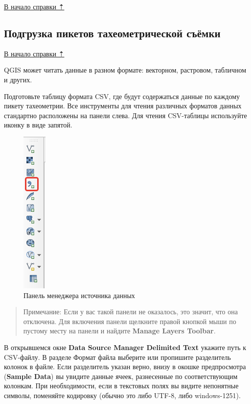 \documentclass[
  12pt,
]{book}
\begin{document}
\hyperref[practice]{В начало справки ⇡}

\subsection{Подгрузка пикетов тахеометрической съёмки}\label{practice-topo-csv-table-reading}

\hyperref[practice-topo]{В начало справки ⇡}

QGIS может читать данные в разном формате: векторном, растровом, табличном и других.

Подготовьте таблицу формата CSV, где будут содержаться данные по каждому пикету тахеометрии. Все инструменты для чтения различных форматов данных стандартно расположены на панели слева. Для чтения CSV-таблицы используйте иконку в виде запятой.

\begin{figure}
\centering
\includegraphics{images/Practice/Open_data.png}
\caption{Панель менеджера источника данных}
\end{figure}

\begin{quote}
Примечание: Если у вас такой панели не оказалось, это значит, что она отключена. Для включения панели щелкните правой кнопкой мыши по пустому месту на панели и найдите \textbf{Manage Layers Toolbar}.
\end{quote}

В открывшемся окне \textbf{Data Source Manager \textbar{} Delimited Text} укажите путь к CSV-файлу. В разделе Формат файла выберите или пропишите разделитель колонок в файле. Если разделитель указан верно, внизу в окошке предпросмотра (\textbf{Sample Data}) вы увидите данные ячеек, разнесенные по соответствующим колонкам. При необходимости, если в текстовых полях вы видите непонятные символы, поменяйте кодировку (обычно это либо UTF-8, либо windows-1251).
\end{document}
